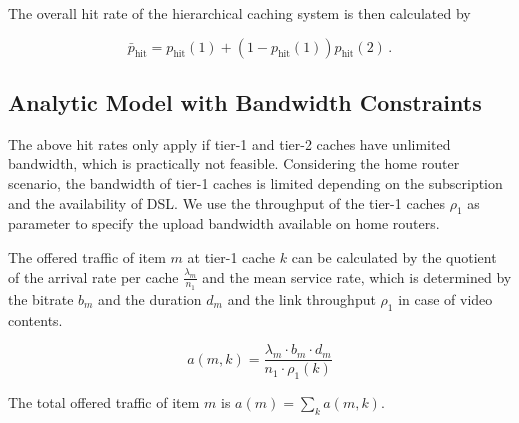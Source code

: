 
The overall hit rate of the hierarchical caching system is then calculated by

\begin{equation}
\bar{p}_\text{hit} = p_\text{hit}(1)+(1-p_\text{hit}(1))p_\text{hit}(2) \, .
\end{equation}


\subsection{Analytic Model with Bandwidth Constraints}

The above hit rates only apply if tier-1 and tier-2 caches have unlimited bandwidth, which is practically not feasible.
Considering the home router scenario, the bandwidth of tier-1 caches is limited depending on the subscription and the availability of DSL.
We use the throughput of the tier-1 caches $\rho_1$ as parameter to specify the upload bandwidth available on home routers.




The offered traffic of item $m$ at tier-1 cache $k$ can be calculated by the quotient of the arrival rate per cache $\frac{\lambda_m}{n_1}$ and the mean service rate, which is determined by the bitrate $b_m$ and the duration $d_m$ and the link throughput $\rho_1$ in case of video contents.

\begin{equation}
a(m,k) = \frac{\lambda_m \cdot b_m \cdot d_m}{n_1\cdot \rho_1(k)}
\end{equation}

The total offered traffic of item $m$ is $a(m) = \sum_k a(m,k)$.


